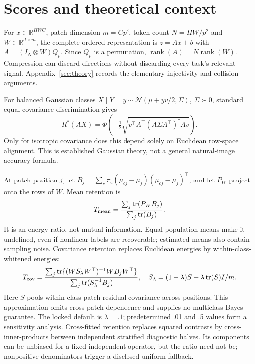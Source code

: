 \documentclass[11pt]{article}
\begin{document}
\section{Scores and theoretical context}
For $x\in\mathbb R^{HWC}$, patch dimension $m=Cp^2$, token count $N=HW/p^2$ and $W\in\mathbb R^{d\times m}$, the complete ordered representation is $z=Ax+b$ with $A=(I_N\otimes W)Q_p$. Since $Q_p$ is a permutation, $\operatorname{rank}(A)=N\operatorname{rank}(W)$. Compression can discard directions without discarding every task's relevant signal. Appendix~\ref{sec:theory} records the elementary injectivity and collision arguments.

For balanced Gaussian classes $X\mid Y=y\sim\mathcal N(\mu+yv/2,\Sigma)$, $\Sigma\succ0$, standard equal-covariance discrimination gives
\begin{equation}\label{eq:general_gaussian}
R^*(AX)=\Phi\!\left(-\tfrac12\sqrt{v^\top A^\top(A\Sigma A^\top)^\dagger Av}\right).
\end{equation}
Only for isotropic covariance does this depend solely on Euclidean row-space alignment. This is established Gaussian theory, not a general natural-image accuracy formula.

At patch position $j$, let $B_j=\sum_c\pi_c(\mu_{cj}-\mu_j)(\mu_{cj}-\mu_j)^\top$, and let $P_W$ project onto the rows of $W$. Mean retention is
\begin{equation}\label{eq:mean_retention}
T_{\rm mean}=\frac{\sum_j\operatorname{tr}(P_WB_j)}{\sum_j\operatorname{tr}(B_j)}.
\end{equation}
It is an energy ratio, not mutual information. Equal population means make it undefined, even if nonlinear labels are recoverable; estimated means also contain sampling noise. Covariance retention replaces Euclidean energies by within-class-whitened energies:
\begin{equation}\label{eq:covret}
T_{\rm cov}=\frac{\sum_j\operatorname{tr}\{(WS_\lambda W^\top)^{-1}WB_jW^\top\}}
{\sum_j\operatorname{tr}(S_\lambda^{-1}B_j)},\quad
S_\lambda=(1-\lambda)S+\lambda\operatorname{tr}(S)I/m.
\end{equation}
Here $S$ pools within-class patch residual covariance across positions. This approximation omits cross-patch dependence and supplies no multiclass Bayes guarantee. The locked default is $\lambda=.1$; predetermined .01 and .5 values form a sensitivity analysis. Cross-fitted retention replaces squared contrasts by cross-inner-products between independent stratified diagnostic halves. Its components can be unbiased for a fixed independent operator, but the ratio need not be; nonpositive denominators trigger a disclosed uniform fallback.
\end{document}
